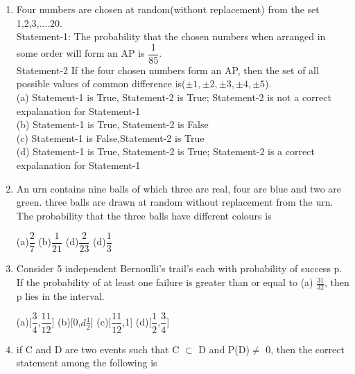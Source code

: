 \documentclass[journal,12pt,twocolumn]{IEEEtran}
\begin{document}
\begin{enumerate}[label=\arabic*]
	\begin{multicols}{4}
	(a)$\dfrac{1}{7}$  (b)$\dfrac{5}{14}$   (c)$\dfrac{1}{50}$  (d)$\dfrac{1}{14}$
	\end{multicols}
	\item Four numbers are chosen at random(without replacement) from the set {1,2,3,....20}.\\
	Statement-1: The probability that the chosen numbers when arranged in some order will form an AP is $\dfrac{1}{85}$.\\
	Statement-2 If the four chosen numbers form an AP, then the set of all possible values of common difference is($\pm1,\pm2,\pm3,\pm4,\pm5$).\\
	(a) Statement-1 is True, Statement-2 is True; Statement-2 is not a correct expalanation for Statement-1\\
	(b) Statement-1 is True, Statement-2 is False\\
	(c) Statement-1 is False,Statement-2 is True\\
	(d) Statement-1 is True, Statement-2 is True; Statement-2 is a correct expalanation for Statement-1\\
	\item An urn contains nine balls of which three are real, four are blue and two are green. three balls are drawn at random without replacement from the urn. The probability that the three balls have different colours is
	\begin{multicols}{4}
	(a)$\dfrac{2}{7}$  (b)$\dfrac{1}{21}$   (d)$\dfrac{2}{23}$  (d)$\dfrac{1}{3}$
	\end{multicols}
	\item Consider 5 independent Bernoulli's trail's each with probability of success p. If the probability of at least one failure is greater than or equal to (a) $\frac{31}{32}$, then p lies in the interval.
	\begin{multicols}{2}
	(a)[$\dfrac{3}{4}$,$\dfrac{11}{12}$]  (b)[0,$d\frac{1}{2}$] 
	(c)[$\dfrac{11}{12}$,1]  (d)[$\dfrac{1}{2}$,$\dfrac{3}{4}$]
	\end{multicols}
	\item if C and D are two events such that C $\subset$ D and P(D)$\neq$ 0, then the correct statement among the following is
	\begin{itemize}
	\begin{multicols}{2}
	\item[(a)]$P(C|D)\geq$P(C)  \item[(b)]$P(C|D)<$P(C) 
	\item[(c)]$P(C|D)$ = $\dfrac{P(D)}{P(C)}$    \item[(d)]$P(C|D)$ = P(C)

\end{multicols}
\end{itemize}
\end{enumerate}
\end{document}
